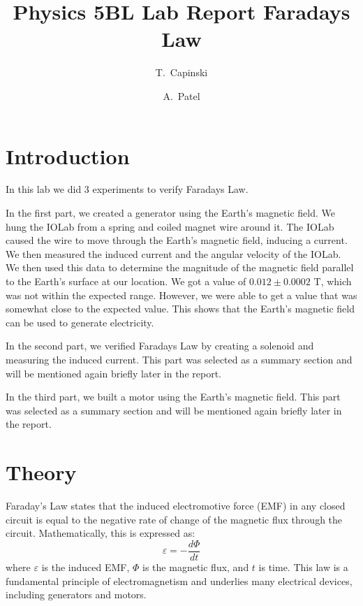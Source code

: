 \documentclass[11pt]{article}
\title{Physics 5BL Lab Report Faradays Law}
\author{T.~Capinski \and A.~Patel}
\let\oldsection\section
\renewcommand\section{\clearpage\oldsection}
\begin{document}
    \maketitle
    \tableofcontents

    \section*{Introduction}\label{sec:introduction}

    In this lab we did 3 experiments to verify Faradays Law. 
    
    In the first part, we created a generator using the Earth's magnetic field.
    We hung the IOLab from a spring and coiled magnet wire around it.
    The IOLab caused the wire to move through the Earth's magnetic field, inducing a current.
    We then measured the induced current and the angular velocity of the IOLab.
    We then used this data to determine the magnitude of the magnetic field parallel to the Earth's surface at our location.
    We got a value of $0.012 \pm 0.0002$ T, which was not within the expected range.
    However, we were able to get a value that was somewhat close to the expected value.
    This shows that the Earth's magnetic field can be used to generate electricity.


    In the second part, we verified Faradays Law by creating a solenoid and measuring the induced current. This part was selected as a summary section and will be mentioned again briefly later in the report.
    
    In the third part, we built a motor using the Earth's magnetic field. This part was selected as a summary section and will be mentioned again briefly later in the report.


    \section*{Theory}\label{sec:theory}

    Faraday's Law states that the induced electromotive force (EMF) in any closed circuit is equal to the negative rate of change of the magnetic flux through the circuit.
    Mathematically, this is expressed as:
    \begin{equation}
        \varepsilon = -\frac{d\Phi}{dt}
        \label{eq:faraday}
    \end{equation}
    where $\varepsilon$ is the induced EMF, $\Phi$ is the magnetic flux, and $t$ is time.
    This law is a fundamental principle of electromagnetism and underlies many electrical devices, including generators and motors.
\end{document}
